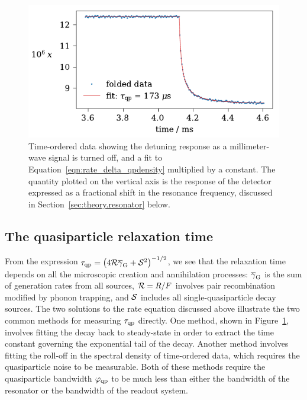 \begin{figure}[htb]
\centering
\includegraphics[width=\textwidth]{theory/mkidarray02_chosen_one_x_fold_fit.pdf}
\caption[Time-ordered data showing the detuning response as a millimeter-wave signal is turned off, and a fit.]
{
Time-ordered data showing the detuning response as a millimeter-wave signal is turned off, and a fit to Equation~\ref{eqn:rate_delta_qpdensity} multiplied by a constant.
The quantity plotted on the vertical axis is the response of the detector expressed as a fractional shift in the resonance frequency, discussed in Section~\ref{sec:theory.resonator} below.
}
\label{fig:mkidarray02_chosen_one_x_fold_fit}
\end{figure}


\subsection{The quasiparticle relaxation time}
\label{sec:theory.qpnumber.qprelaxationtime}

From the expression
$\tau_{\mathrm{qp}}
  =
  \left( 4 \mathcal{R} \overline{\gamma}_{\mathrm{G}} + \mathcal{S}^2 \right)^{-1/2}$,
we see that the relaxation time depends on all the microscopic creation and annihilation processes:
$\overline{\gamma}_{\mathrm{G}}$ is the sum of generation rates from all sources,
$\mathcal{R} = R / F$
involves pair recombination modified by phonon trapping, and $\mathcal{S}$ includes all single-quasiparticle decay sources.
The two solutions to the rate equation discussed above illustrate the two common methods for measuring $\tau_{\mathrm{qp}}$ directly.
One method, shown in Figure~\ref{fig:mkidarray02_chosen_one_x_fold_fit}, involves fitting the decay back to steady-state in order to extract the time constant governing the exponential tail of the decay.
Another method involves fitting the roll-off in the spectral density of time-ordered data, which requires the quasiparticle noise to be measurable.
Both of these methods require the quasiparticle bandwidth $\varphi_{\mathrm{qp}}$ to be much less than either the bandwidth of the resonator or the bandwidth of the readout system.

